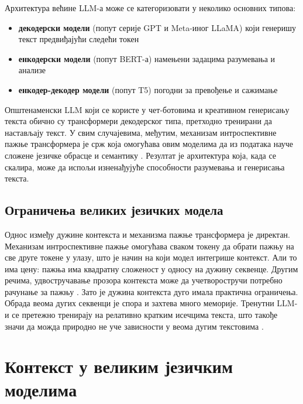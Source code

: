 Архитектура већине LLM-а може се категоризовати у неколико основних типова:

\begin{itemize}
\item \textbf{декодерски модели} (попут серије GPT и Meta-иног LLaMA) који генеришу текст предвиђајући следећи токен
\item \textbf{енкодерски модели} (попут BERT-а) намењени задацима разумевања и анализе
\item \textbf{енкодер-декодер модели} (попут T5) погодни за превођење и сажимање \cite{vaswani_attention_2017,lu_large_2024}
\end{itemize}

Општенаменски LLM који се користе у чет-ботовима и креативном генерисању текста обично су трансформери декодерског типа, претходно тренирани да настављају текст. У свим случајевима, међутим, механизам интроспективне пажње трансформера је срж која омогућава овим моделима да из података науче сложене језичке обрасце и семантику \cite{vaswani_attention_2017}. Резултат је архитектура која, када се скалира, може да испољи изненађујуће способности разумевања и генерисања текста.

\subsection{Ограничења великих језичких модела}

Однос између дужине контекста и механизма пажње трансформера је директан. Механизам интроспективне пажње омогућава сваком токену да обрати пажњу на све друге токене у улазу, што је начин на који модел интегрише контекст. Али то има цену: пажња има квадратну сложеност у односу на дужину секвенце. Другим речима, удвостручавање прозора контекста може да учетворостручи потребно рачунање за пажњу \cite{vaswani_attention_2017,lu_large_2024}. Зато је дужина контекста дуго имала практична ограничења. Обрада веома дугих секвенци је спора и захтева много меморије. Тренутни LLM-и се претежно тренирају на релативно кратким исечцима текста, што такође значи да можда природно не уче зависности у веома дугим текстовима \cite{lu_large_2024}.

\section{Контекст у великим језичким моделима}
\label{sec:llm_context}

